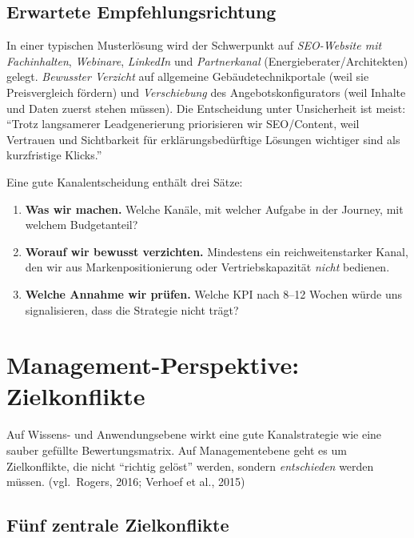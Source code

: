 \documentclass[11pt,a4paper,oneside]{article}
\newcommand{\quelle}[1]{{\footnotesize\color{lpGray}(#1)}}
\begin{document}
\subsection{Erwartete Empfehlungsrichtung}

In einer typischen Musterlösung wird der Schwerpunkt auf \emph{SEO-Website mit Fachinhalten}, \emph{Webinare}, \emph{LinkedIn} und \emph{Partnerkanal} (Energieberater/Architekten) gelegt. \emph{Bewusster Verzicht} auf allgemeine Gebäudetechnikportale (weil sie Preisvergleich fördern) und \emph{Verschiebung} des Angebotskonfigurators (weil Inhalte und Daten zuerst stehen müssen). Die Entscheidung unter Unsicherheit ist meist: ``Trotz langsamerer Leadgenerierung priorisieren wir SEO/Content, weil Vertrauen und Sichtbarkeit für erklärungsbedürftige Lösungen wichtiger sind als kurzfristige Klicks.''

\begin{merkbox}
Eine gute Kanalentscheidung enthält drei Sätze:
\begin{enumerate}
  \item \textbf{Was wir machen.} Welche Kanäle, mit welcher Aufgabe in der Journey, mit welchem Budgetanteil?
  \item \textbf{Worauf wir bewusst verzichten.} Mindestens ein reichweitenstarker Kanal, den wir aus Markenpositionierung oder Vertriebskapazität \emph{nicht} bedienen.
  \item \textbf{Welche Annahme wir prüfen.} Welche KPI nach 8--12 Wochen würde uns signalisieren, dass die Strategie nicht trägt?
\end{enumerate}
\end{merkbox}

\section{Management-Perspektive: Zielkonflikte}

Auf Wissens- und Anwendungsebene wirkt eine gute Kanalstrategie wie eine sauber gefüllte Bewertungsmatrix. Auf Managementebene geht es um Zielkonflikte, die nicht ``richtig gelöst'' werden, sondern \emph{entschieden} werden müssen. \quelle{vgl.\ Rogers, 2016; Verhoef et al., 2015}

\subsection{Fünf zentrale Zielkonflikte}
\end{document}
